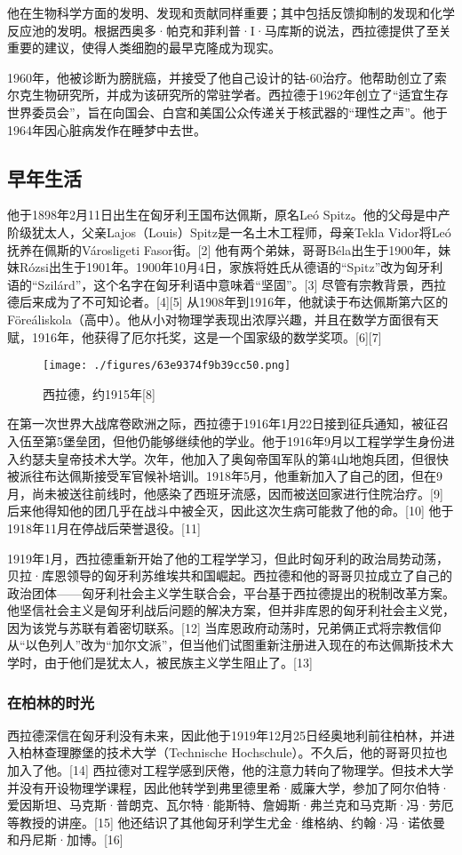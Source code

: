 他在生物科学方面的发明、发现和贡献同样重要；其中包括反馈抑制的发现和化学反应池的发明。根据西奥多·帕克和菲利普·I·马库斯的说法，西拉德提供了至关重要的建议，使得人类细胞的最早克隆成为现实。

1960年，他被诊断为膀胱癌，并接受了他自己设计的钴-60治疗。他帮助创立了索尔克生物研究所，并成为该研究所的常驻学者。西拉德于1962年创立了“适宜生存世界委员会”，旨在向国会、白宫和美国公众传递关于核武器的“理性之声”。他于1964年因心脏病发作在睡梦中去世。
\subsection{早年生活}  
他于1898年2月11日出生在匈牙利王国布达佩斯，原名Leó Spitz。他的父母是中产阶级犹太人，父亲Lajos（Louis）Spitz是一名土木工程师，母亲Tekla Vidor将Leó抚养在佩斯的Városligeti Fasor街。[2] 他有两个弟妹，哥哥Béla出生于1900年，妹妹Rózsi出生于1901年。1900年10月4日，家族将姓氏从德语的“Spitz”改为匈牙利语的“Szilárd”，这个名字在匈牙利语中意味着“坚固”。[3] 尽管有宗教背景，西拉德后来成为了不可知论者。[4][5] 从1908年到1916年，他就读于布达佩斯第六区的Föreáliskola（高中）。他从小对物理学表现出浓厚兴趣，并且在数学方面很有天赋，1916年，他获得了厄尔托奖，这是一个国家级的数学奖项。[6][7]
\begin{figure}[ht]
\centering
\texttt{[image: ./figures/63e9374f9b39cc50.png]}
\caption{西拉德，约1915年[8]} \label{fig_Szilar_2}
\end{figure}
在第一次世界大战席卷欧洲之际，西拉德于1916年1月22日接到征兵通知，被征召入伍至第5堡垒团，但他仍能够继续他的学业。他于1916年9月以工程学学生身份进入约瑟夫皇帝技术大学。次年，他加入了奥匈帝国军队的第4山地炮兵团，但很快被派往布达佩斯接受军官候补培训。1918年5月，他重新加入了自己的团，但在9月，尚未被送往前线时，他感染了西班牙流感，因而被送回家进行住院治疗。[9] 后来他得知他的团几乎在战斗中被全灭，因此这次生病可能救了他的命。[10] 他于1918年11月在停战后荣誉退役。[11]

1919年1月，西拉德重新开始了他的工程学学习，但此时匈牙利的政治局势动荡，贝拉·库恩领导的匈牙利苏维埃共和国崛起。西拉德和他的哥哥贝拉成立了自己的政治团体——匈牙利社会主义学生联合会，平台基于西拉德提出的税制改革方案。他坚信社会主义是匈牙利战后问题的解决方案，但并非库恩的匈牙利社会主义党，因为该党与苏联有着密切联系。[12] 当库恩政府动荡时，兄弟俩正式将宗教信仰从“以色列人”改为“加尔文派”，但当他们试图重新注册进入现在的布达佩斯技术大学时，由于他们是犹太人，被民族主义学生阻止了。[13]
\subsubsection{在柏林的时光}  
西拉德深信在匈牙利没有未来，因此他于1919年12月25日经奥地利前往柏林，并进入柏林查理滕堡的技术大学（Technische Hochschule）。不久后，他的哥哥贝拉也加入了他。[14] 西拉德对工程学感到厌倦，他的注意力转向了物理学。但技术大学并没有开设物理学课程，因此他转学到弗里德里希·威廉大学，参加了阿尔伯特·爱因斯坦、马克斯·普朗克、瓦尔特·能斯特、詹姆斯·弗兰克和马克斯·冯·劳厄等教授的讲座。[15] 他还结识了其他匈牙利学生尤金·维格纳、约翰·冯·诺依曼和丹尼斯·加博。[16]

